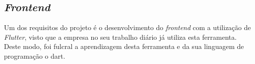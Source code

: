 \subsection{\textit{Frontend}}
Um dos requisitos do projeto é o desenvolvimento do \textit{frontend} com a utilização de \textit{Flutter}, visto que a empresa no seu trabalho diário já utiliza esta ferramenta. Deste modo, foi fulcral a aprendizagem desta ferramenta e da sua linguagem de programação o dart.



\newpage 



\newpage


